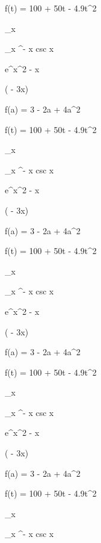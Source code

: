 \documentclass[11pt,a4paper]{article}
\begin{document}
f(t) = 100 + 50t - 4.9t^2

\lim_{x } 

\lim_{x \pi^-} x csc x

 

 e^{x^2 - x}

 

 ( - 3x)

f(a) = 3 - 2a + 4a^2

f(t) = 100 + 50t - 4.9t^2

\lim_{x } 

\lim_{x \pi^-} x csc x

 

 e^{x^2 - x}

 

 ( - 3x)

f(a) = 3 - 2a + 4a^2

f(t) = 100 + 50t - 4.9t^2

\lim_{x } 

\lim_{x \pi^-} x csc x

 

 e^{x^2 - x}

 

 ( - 3x)

f(a) = 3 - 2a + 4a^2

f(t) = 100 + 50t - 4.9t^2

\lim_{x } 

\lim_{x \pi^-} x csc x

 

 e^{x^2 - x}

 

 ( - 3x)

f(a) = 3 - 2a + 4a^2

f(t) = 100 + 50t - 4.9t^2

\lim_{x } 

\lim_{x \pi^-} x csc x

 
\end{document}
